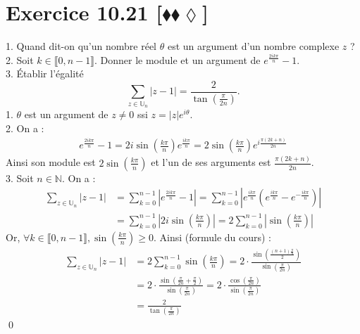 \documentclass[10pt]{article}
\begin{document}
\section*{Exercice 10.21 [$\blacklozenge\blacklozenge\lozenge$]}
\begin{tcolorbox}[enhanced, width=7in, center, size=fbox, fontupper=\large, drop shadow southwest]
    1. Quand dit-on qu'un nombre réel $\theta$ est un argument d'un nombre complexe $z$ ?\\
    2. Soit $k\in\llbracket0,n-1\rrbracket$. Donner le module et un argument de $e^{\frac{2ik\pi}{n}}-1$.\\
    3. Établir l'égalité
    \begin{equation*}
        \sum_{z\in\mathbb{U}_n}{|z-1|}=\frac{2}{\tan\left( \frac{\pi}{2n} \right)}.
    \end{equation*}
    1. $\theta$ est un argument de $z\neq0$ ssi $z=|z|e^{i\theta}$.\\
    2. On a :
    \begin{align*}
        e^{\frac{2ik\pi}{n}}-1=2i\sin\left( \frac{k\pi}{n} \right)e^{\frac{ik\pi}{n}}=2\sin\left( \frac{k\pi}{n} \right)e^{i\frac{\pi(2k+n)}{2n}}
    \end{align*}
    Ainsi son module est $2\sin\left( \frac{k\pi}{n} \right)$ et l'un de ses arguments est $\frac{\pi(2k+n)}{2n}$.\\
    3. Soit $n\in\mathbb{N}$. On a :
    \begin{align*}
        \sum_{z\in\mathbb{U}_n}{|z-1|}&=\sum_{k=0}^{n-1}{|e^{\frac{2ik\pi}{n}}-1|} = \sum_{k=0}^{n-1}{|e^{\frac{ik\pi}{n}}\left( e^{\frac{ik\pi}{n}} - e^{-\frac{ik\pi}{n}} \right)|}\\
        &=\sum_{k=0}^{n-1}{\left|2i\sin\left( \frac{k\pi}{n} \right)\right|} = 2\sum_{k=0}^{n-1}{\left|\sin\left( \frac{k\pi}{n} \right)\right|}
    \end{align*}
    Or, $\forall{k\in\llbracket0,n-1\rrbracket}, \sin\left( \frac{k\pi}{n} \right) \geq 0$. Ainsi (formule du cours) :
    \begin{align*}
        \sum_{z\in\mathbb{U}_n}{|z-1|} &= 2\sum_{k=0}^{n-1}{\sin\left( \frac{k\pi}{n} \right)} = 2 \cdot \frac{ \sin \left( \frac{(n+1) \frac{\pi}{n}}{2} \right)}{\sin \left( \frac{\pi}{2n} \right)}\\
        &= 2 \cdot \frac{\sin\left( \frac{\pi}{2n} + \frac{\pi}{2} \right)}{\sin \left( \frac{\pi}{2n} \right)} = 2 \cdot \frac{\cos\left( \frac{\pi}{2n} \right)}{\sin\left( \frac{\pi}{2n} \right)}\\
        &= \frac{2}{\tan\left( \frac{\pi}{2n} \right)}
    \end{align*}
    \qed
\end{tcolorbox}

\end{document}
